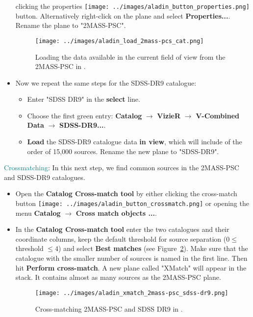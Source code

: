 \documentclass [a4paper, 12pt]{article}
\begin{document}
\begin{itemize}
    clicking the properties \texttt{[image: ../images/aladin\_button\_properties.png]} button. Alternatively
    right-click on the plane and select \textbf{Properties...}. Rename the
    plane to "2MASS-PSC".
    \begin{figure}[H]
        \center
        \texttt{[image: ../images/aladin\_load\_2mass-pcs\_cat.png]}
        \caption{Loading the data available in the current field of view from
        the 2MASS-PSC in \aladin.}
        \label{fig:load_2mass_aladin}
    \end{figure}
    \item Now we repeat the same steps for the SDSS-DR9 catalogue:
    \begin{itemize}
        \item Enter "SDSS DR9" in the \textbf{select} line.
        \item Choose the first green entry: \textbf{Catalog} $\rightarrow$
        \textbf{VizieR} $\rightarrow$ \textbf{V-Combined Data} $\rightarrow$
        \textbf{SDSS-DR9...}.
        \item \textbf{Load} the SDSS-DR9 catalogue data \textbf{in view}, which
        will include of the order of 15,000 sources. Rename the new plane to
        "SDSS-DR9".
    \end{itemize}
\end{itemize}

\noindent \textcolor{teal}{Crossmatching}: In this next step, we find common
sources in
the 2MASS-PSC and SDSS-DR9 catalogues.
\begin{itemize}
    \item Open the \textbf{Catalog Cross-match tool} by either clicking the
    cross-match button \texttt{[image: ../images/aladin\_button\_crossmatch.png]} or opening the menu
    \textbf{Catalog} $\rightarrow$ \textbf{Cross match objects ...}.
    \item In the \textbf{Catalog Cross-match tool} enter the two catalogues and
    their coordinate columns, keep the default threshold for source separation
    ($0 \le $ threshold $\le 4$) and select \textbf{Best matches} (see
    Figure~\ref{fig:crossmatch_2mass_sdss_aladin}). Make sure
    that the catalogue with the smaller number of sources is named in the first
    line. Then hit \textbf{Perform cross-match}. A new plane called "XMatch"
    will appear in the stack. It contains almost as many sources as the
    2MASS-PSC plane.
    \begin{figure}[H]
        \center
        \texttt{[image: ../images/aladin\_xmatch\_2mass-psc\_sdss-dr9.png]}
        \caption{Cross-matching 2MASS-PSC and SDSS DR9 in \aladin.}
        \label{fig:crossmatch_2mass_sdss_aladin}
    \end{figure}
\end{itemize}
\end{document}
